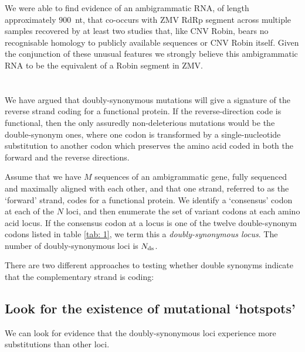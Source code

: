 \documentclass[unnumsec,webpdf,contemporary,large,namedate]{oup-authoring-template}%
\theoremstyle{thmstyleone}%
\theoremstyle{thmstyletwo}%
\theoremstyle{thmstylethree}%
\begin{document}
We were able to find evidence of an ambigrammatic RNA, of length approximately
$900$~nt, that co-occurs with ZMV RdRp segment across multiple samples
recovered by at least two studies that, like CNV Robin, bears no recognisable
homology to publicly available sequences or CNV Robin itself.  Given the
conjunction of these unusual features we strongly believe this ambigrammatic
RNA to be the equivalent of a Robin segment in ZMV.

\section{}
\label{sec: 4}

\subsection{}
\label{sec: 4.1}

We have argued that doubly-synonymous mutations will give a signature of the
reverse strand coding for a functional protein. If the reverse-direction code is functional,
then the only assuredly non-deleterious mutations would be the double-synonym ones,
where one codon is transformed by a single-nucleotide substitution to another
codon which preserves the amino acid coded in both the forward and
the reverse directions.

Assume that we have $M$ sequences of an ambigrammatic gene, fully sequenced and
maximally aligned with each other, and that one strand, referred to as the
\lq forward' strand, codes for a functional protein.
We identify a \lq consensus' codon at each of the $N$ loci,
and then enumerate the set of variant codons at each amino acid locus.
If the consensus codon at a locus is one of the twelve
double-synonym codons listed in table \ref{tab: 1}, we term this a \emph{doubly-synonymous locus}.
The number of doubly-synonymous loci is $N_{\rm ds}$.

There are two different approaches to testing whether
double synonyms indicate that the complementary strand is coding:

\subsection{Look for the existence of mutational \lq hotspots'}
\label{sec: 4.1}

We can look for evidence that the doubly-synonymous loci experience more substitutions than other loci.
\end{document}
